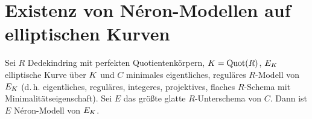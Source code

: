 \documentclass[german]{scrreprt}
\begin{document}
\chapter{Existenz von Néron-Modellen auf elliptischen Kurven}
\begin{Satz}\label{thm:exneronmodelle}

  Sei $R$ Dedekindring mit perfekten Quotientenkörpern,
  $K=\operatorname{Quot}(R)$, $E_{K}$ elliptische Kurve über $K$ und $C$ minimales
  eigentliches, reguläres $R$-Modell von $E_{K}$
  (d.\,h. eigentliches, reguläres, integeres, projektives,
  flaches $R$-Schema mit Minimalitätseigenschaft).
  Sei $E$ das größte glatte $R$-Unterschema von $C$.
  Dann ist $E$ Néron-Modell von $E_{K}$.


\end{Satz}
\end{document}
